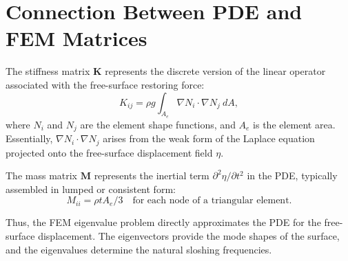 \documentclass{article}
\begin{document}
\section{Connection Between PDE and FEM Matrices}
The stiffness matrix $\bm{K}$ represents the discrete version of the linear operator associated with the free-surface restoring force:
\begin{equation}
K_{ij} = \rho g \int_{A_e} \nabla N_i \cdot \nabla N_j ~ dA,
\end{equation}
where $N_i$ and $N_j$ are the element shape functions, and $A_e$ is the element area. Essentially, $\nabla N_i \cdot \nabla N_j$ arises from the weak form of the Laplace equation projected onto the free-surface displacement field $\eta$.


The mass matrix $\bm{M}$ represents the inertial term $\partial^2 \eta/\partial t^2$ in the PDE, typically assembled in lumped or consistent form:
\begin{equation}
M_{ii} = \rho t A_e / 3 \quad \text{for each node of a triangular element}.
\end{equation}


Thus, the FEM eigenvalue problem directly approximates the PDE for the free-surface displacement. The eigenvectors provide the mode shapes of the surface, and the eigenvalues determine the natural sloshing frequencies.
\end{document}
